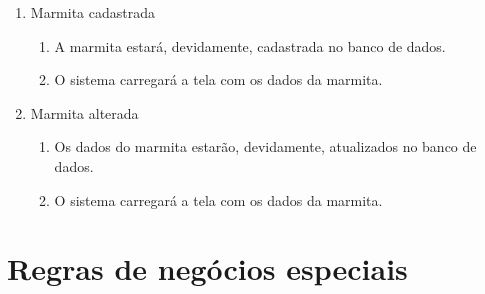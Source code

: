 \begin{enumerate}
	\item Marmita cadastrada
	\begin{enumerate}
		\item A marmita estará, devidamente, cadastrada no banco de dados.
		\item O sistema carregará a tela com os dados da marmita.
	\end{enumerate}
	
	\item Marmita alterada
	\begin{enumerate}
		\item Os dados do marmita estarão, devidamente, atualizados no banco de dados.
		\item O sistema carregará a tela com os dados da marmita.
	\end{enumerate}
\end{enumerate}

\section{Regras de negócios especiais}

